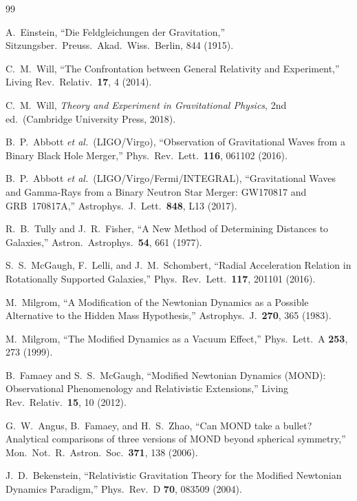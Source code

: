 \begin{thebibliography}{99}

A.~Einstein,
``Die Feldgleichungen der Gravitation,''
Sitzungsber.\ Preuss.\ Akad.\ Wiss.\ Berlin, 844 (1915).

C.~M.~Will,
``The Confrontation between General Relativity and Experiment,''
Living Rev.\ Relativ.\ \textbf{17}, 4 (2014).

C.~M.~Will,
\textit{Theory and Experiment in Gravitational Physics},
2nd ed.\ (Cambridge University Press, 2018).

B.~P.~Abbott \textit{et al.}\ (LIGO/Virgo),
``Observation of Gravitational Waves from a Binary Black Hole Merger,''
Phys.\ Rev.\ Lett.\ \textbf{116}, 061102 (2016).

B.~P.~Abbott \textit{et al.}\ (LIGO/Virgo/Fermi/INTEGRAL),
``Gravitational Waves and Gamma-Rays from a Binary Neutron Star Merger: GW170817 and GRB~170817A,''
Astrophys.\ J.\ Lett.\ \textbf{848}, L13 (2017).

R.~B.~Tully and J.~R.~Fisher,
``A New Method of Determining Distances to Galaxies,''
Astron.\ Astrophys.\ \textbf{54}, 661 (1977).

S.~S.~McGaugh, F.~Lelli, and J.~M.~Schombert,
``Radial Acceleration Relation in Rotationally Supported Galaxies,''
Phys.\ Rev.\ Lett.\ \textbf{117}, 201101 (2016).

M.~Milgrom,
``A Modification of the Newtonian Dynamics as a Possible Alternative to the Hidden Mass Hypothesis,''
Astrophys.\ J.\ \textbf{270}, 365 (1983).

M.~Milgrom,
``The Modified Dynamics as a Vacuum Effect,''
Phys.\ Lett.\ A \textbf{253}, 273 (1999).

B.~Famaey and S.~S.~McGaugh,
``Modified Newtonian Dynamics (MOND): Observational Phenomenology and Relativistic Extensions,''
Living Rev.\ Relativ.\ \textbf{15}, 10 (2012).

G.~W.~Angus, B.~Famaey, and H.~S.~Zhao,
``Can MOND take a bullet? Analytical comparisons of three versions of MOND beyond spherical symmetry,''
Mon.\ Not.\ R.\ Astron.\ Soc.\ \textbf{371}, 138 (2006).

J.~D.~Bekenstein,
``Relativistic Gravitation Theory for the Modified Newtonian Dynamics Paradigm,''
Phys.\ Rev.\ D \textbf{70}, 083509 (2004).


\end{thebibliography}
